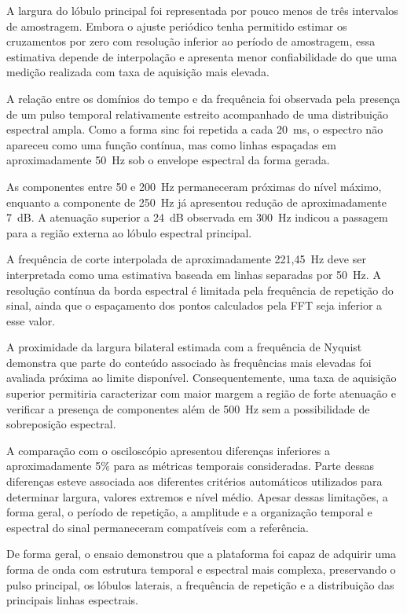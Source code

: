 \documentclass[a4paper,12pt]{fcte}
\begin{document}
A largura do lóbulo principal foi representada por pouco menos de três intervalos de amostragem. Embora o ajuste periódico tenha permitido estimar os cruzamentos por zero com resolução inferior ao período de amostragem, essa estimativa depende de interpolação e apresenta menor confiabilidade do que uma medição realizada com taxa de aquisição mais elevada.

A relação entre os domínios do tempo e da frequência foi observada pela presença de um pulso temporal relativamente estreito acompanhado de uma distribuição espectral ampla. Como a forma sinc foi repetida a cada 20~ms, o espectro não apareceu como uma função contínua, mas como linhas espaçadas em aproximadamente 50~Hz sob o envelope espectral da forma gerada.

As componentes entre 50 e 200~Hz permaneceram próximas do nível máximo, enquanto a componente de 250~Hz já apresentou redução de aproximadamente 7~dB. A atenuação superior a 24~dB observada em 300~Hz indicou a passagem para a região externa ao lóbulo espectral principal.

A frequência de corte interpolada de aproximadamente 221,45~Hz deve ser interpretada como uma estimativa baseada em linhas separadas por 50~Hz. A resolução contínua da borda espectral é limitada pela frequência de repetição do sinal, ainda que o espaçamento dos pontos calculados pela FFT seja inferior a esse valor.

A proximidade da largura bilateral estimada com a frequência de Nyquist demonstra que parte do conteúdo associado às frequências mais elevadas foi avaliada próxima ao limite disponível. Consequentemente, uma taxa de aquisição superior permitiria caracterizar com maior margem a região de forte atenuação e verificar a presença de componentes além de 500~Hz sem a possibilidade de sobreposição espectral.

A comparação com o osciloscópio apresentou diferenças inferiores a aproximadamente 5\% para as métricas temporais consideradas. Parte dessas diferenças esteve associada aos diferentes critérios automáticos utilizados para determinar largura, valores extremos e nível médio. Apesar dessas limitações, a forma geral, o período de repetição, a amplitude e a organização temporal e espectral do sinal permaneceram compatíveis com a referência.

De forma geral, o ensaio demonstrou que a plataforma foi capaz de adquirir uma forma de onda com estrutura temporal e espectral mais complexa, preservando o pulso principal, os lóbulos laterais, a frequência de repetição e a distribuição das principais linhas espectrais.
\end{document}
